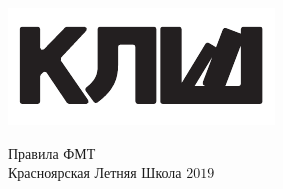 \documentclass[12pt,a4paper]{article}
\begin{document}
\begin{flushleft}
\parbox[t][0pt]{0.2\textwidth}
{
{%
\vspace{0\baselineskip}
\includegraphics[scale=0.5]{klsh_logo_mod.pdf}\par
}
}
\end{flushleft}
\hfill
\parbox[t][0pt]{0.80\textwidth}
{
{\centering
\vspace{-1.5\baselineskip}
\begin{center}
{\Huge Правила ФМТ}\\
{Красноярская Летняя Школа $2019$}\par
\end{center}
}
}
\vspace{2.1\baselineskip}
\end{document}
